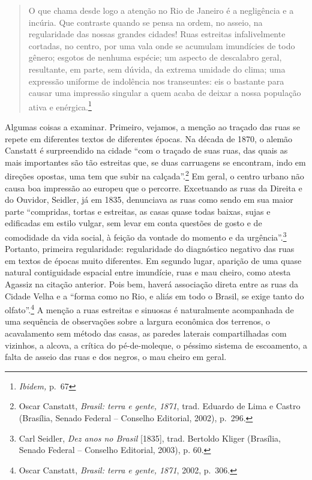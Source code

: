 \begin{quote}
O que chama desde logo a atenção no Rio de Janeiro é a negligência e a
incúria. Que contraste quando se pensa na ordem, no asseio, na
regularidade das nossas grandes cidades! Ruas estreitas infalivelmente
cortadas, no centro, por uma vala onde se acumulam imundícies de todo
gênero; esgotos de nenhuma espécie; um aspecto de descalabro geral,
resultante, em parte, sem dúvida, da extrema umidade do clima; uma
expressão uniforme de indolência nos transeuntes: eis o bastante para
causar uma impressão singular a quem acaba de deixar a nossa população
ativa e enérgica.\footnote{\emph{Ibidem,} p.~67}
\end{quote}

Algumas coisas a examinar. Primeiro, vejamos, a menção ao traçado das
ruas se repete em diferentes textos de diferentes épocas. Na década de
1870, o alemão Canstatt é surpreendido na cidade ``com o traçado de suas
ruas, das quais as mais importantes são tão estreitas que, se duas
carruagens se encontram, indo em direções opostas, uma tem que subir na
calçada''.\footnote{Oscar Canstatt, \emph{Brasil: terra e gente, 1871},
  trad. Eduardo de Lima e Castro (Brasília, Senado Federal -- Conselho
  Editorial, 2002), p.~296.} Em geral, o centro urbano não causa boa
impressão ao europeu que o percorre. Excetuando as ruas da Direita e do
Ouvidor, Seidler, já em 1835, denunciava as ruas como sendo em sua maior
parte ``compridas, tortas e estreitas, as casas quase todas baixas,
sujas e edificadas em estilo vulgar, sem levar em conta questões de
gosto e de comodidade da vida social, à feição da vontade do momento e
da urgência''.\footnote{Carl Seidler, \emph{Dez anos no Brasil}
  {[}1835{]}, trad. Bertoldo Kliger (Brasília, Senado Federal --
  Conselho Editorial, 2003), p. 60.} Portanto, primeira regularidade:
regularidade do diagnóstico negativo das ruas em textos de épocas muito
diferentes. Em segundo lugar, aparição de uma quase natural contiguidade
espacial entre imundície, ruas e mau cheiro, como atesta Agassiz na
citação anterior. Pois bem, haverá associação direta entre as ruas da
Cidade Velha e a ``forma como no Rio, e aliás em todo o Brasil, se exige
tanto do olfato''.\footnote{Oscar Canstatt, \emph{Brasil: terra e gente,
  1871}, 2002, p.~306.} A menção a ruas estreitas e sinuosas é
naturalmente acompanhada de uma sequência de observações sobre a largura
econômica dos terrenos, o acavalamento sem método das casas, as paredes
laterais compartilhadas com vizinhos, a alcova, a crítica do
pé-de-moleque, o péssimo sistema de escoamento, a falta de asseio das
ruas e dos negros, o mau cheiro em geral.

